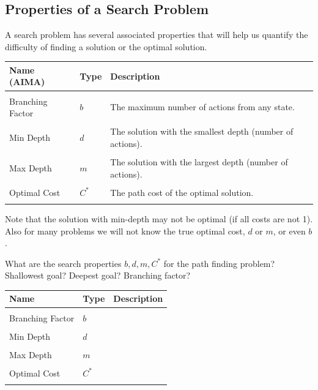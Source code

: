 \documentclass[11pt]{article}
\begin{document}
\subsection{Properties of a Search Problem}

A search problem has several associated properties that will help us quantify the difficulty of finding a solution or the optimal solution. 

\air
\begin{center}
\begin{tabularx}{\linewidth}{llX}
  \toprule
  Name (AIMA) & Type & Description \\
  \midrule
\\
 Branching Factor & $b$ & The maximum number of actions from any state.  \\\\
 Min Depth &  $d$ & The solution with the smallest depth (number of actions).
 \\\\
 Max Depth & $m$& The solution with the largest depth (number of actions). \\\\
 Optimal Cost & $C^*$& The path cost of the optimal solution. \\\\
 \bottomrule
\end{tabularx}
\end{center}

Note that the solution with min-depth may not be optimal (if all costs
are not 1).  Also for many problems we will not know the true optimal
cost, $d$ or $m$, or even $b$. 



\begin{exercise}
  What are the search properties $b, d, m, C^*$ for the path finding
  problem? Shallowest goal? Deepest goal? Branching factor?
\end{exercise}


\air
\begin{center}
\begin{tabularx}{\linewidth}{llX}
  \toprule
  Name  & Type & Description \\
  \midrule
\\
 Branching Factor & $b$ & \censor{}  \\\\
 Min Depth &  $d$ & \censor{} \\\\
 Max Depth & $m$& \censor{} \\\\
 Optimal Cost & $C^*$& \censor{} \\\\
 \bottomrule
\end{tabularx}
\end{center}
\end{document}
